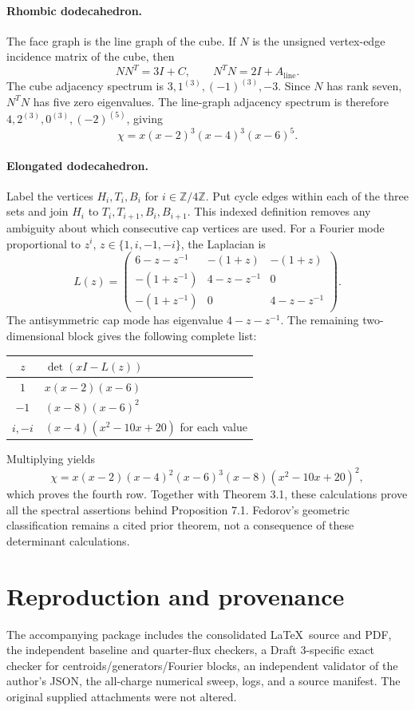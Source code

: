 \documentclass[11pt,a4paper]{article}
\begin{document}
\paragraph{Rhombic dodecahedron.} The face graph is the line graph of the cube. If $N$ is the unsigned vertex-edge incidence matrix of the cube, then
\[
 NN^T=3I+C,\qquad N^TN=2I+A_{\mathrm{line}}.
\]
The cube adjacency spectrum is $3,1^{(3)},(-1)^{(3)},-3$. Since $N$ has rank seven, $N^TN$ has five zero eigenvalues. The line-graph adjacency spectrum is therefore $4,2^{(3)},0^{(3)},(-2)^{(5)}$, giving
\[
 \chi=x(x-2)^3(x-4)^3(x-6)^5.
\]

\paragraph{Elongated dodecahedron.} Label the vertices $H_i,T_i,B_i$ for $i\in\mathbb Z/4\mathbb Z$. Put cycle edges within each of the three sets and join $H_i$ to $T_i,T_{i+1},B_i,B_{i+1}$. This indexed definition removes any ambiguity about which consecutive cap vertices are used. For a Fourier mode proportional to $z^i$, $z\in\{1,i,-1,-i\}$, the Laplacian is
\[
 L(z)=\begin{pmatrix}
 6-z-z^{-1}&-(1+z)&-(1+z)\\
 -(1+z^{-1})&4-z-z^{-1}&0\\
 -(1+z^{-1})&0&4-z-z^{-1}
 \end{pmatrix}.
\]
The antisymmetric cap mode has eigenvalue $4-z-z^{-1}$. The remaining two-dimensional block gives the following complete list:
\begin{center}
\begin{tabular}{cl}\toprule
$z$ & $\det(xI-L(z))$\\\midrule
$1$ & $x(x-2)(x-6)$\\
$-1$ & $(x-8)(x-6)^2$\\
$i,-i$ & $(x-4)(x^2-10x+20)$ for each value\\\bottomrule
\end{tabular}
\end{center}
Multiplying yields
\[
 \chi=x(x-2)(x-4)^2(x-6)^3(x-8)(x^2-10x+20)^2,
\]
which proves the fourth row. Together with Theorem 3.1, these calculations prove all the spectral assertions behind Proposition 7.1. Fedorov's geometric classification remains a cited prior theorem, not a consequence of these determinant calculations.

\section{Reproduction and provenance}
The accompanying package includes the consolidated \LaTeX\ source and PDF, the independent baseline and quarter-flux checkers, a Draft 3-specific exact checker for centroids/generators/Fourier blocks, an independent validator of the author's JSON, the all-charge numerical sweep, logs, and a source manifest. The original supplied attachments were not altered.
\end{document}

